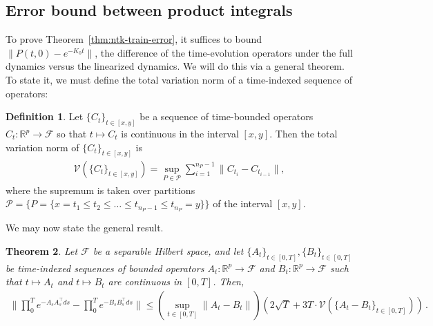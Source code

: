 \documentclass[11pt]{article} %
\newcommand{\R}{\mathbb{R}}
\newcommand{\<}{\langle}
\renewcommand{\>}{\rangle}
\def\cV{{\mathcal V}}
\def\cP{{\mathcal P}}
\def\cF{{\mathcal F}}
\def\cV{{\mathcal V}}
\def\cP{{\mathcal P}}
\def\cF{{\mathcal F}}
\def\cV{{\mathcal V}}
\theoremstyle{plain}
\newtheorem{theorem}{Theorem}[section]
\theoremstyle{definition}
\newtheorem{definition}[theorem]{Definition}
\theoremstyle{remark}
\begin{document}
\subsection{Error bound between product integrals}
To prove Theorem~\ref{thm:ntk-train-error}, it suffices to bound $\|P(t,0) - e^{-K_0t}\|$, the difference of the time-evolution operators under the full dynamics versus the linearized dynamics. We will do this via a general theorem. To state it, we must define the total variation norm of a time-indexed sequence of operators:
\begin{definition}
Let $\{C_t\}_{t \in [x,y]}$ be a sequence of time-bounded operators $C_t : \R^p \to \cF$ so that $t \mapsto C_t$ is continuous in the interval $[x,y]$. Then the total variation norm of $\{C_t\}_{t \in [x,y]}$ is
\begin{align*}
\cV(\{C_t\}_{t \in [x,y]}) = \sup_{P \in \cP} \sum_{i=1}^{n_{P}-1} \|C_{t_i} - C_{t_{i-1}}\|,
\end{align*}
where the supremum is taken over partitions $\cP = \{P = \{x = t_1 \leq t_2 \leq \dots \leq t_{n_P - 1} \leq t_{n_P} = y\}\}$ of the interval $[x,y]$.
\end{definition}

We may now state the general result.

\begin{theorem}\label{thm:operator-difference}
Let $\cF$ be a separable Hilbert space, and let $\{A_t\}_{t \in [0,T]}, \{B_t\}_{t \in [0,T]}$ be time-indexed sequences of bounded operators $A_t : \R^p \to \cF$ and $B_t : \R^p \to \cF$ such that $t \mapsto A_t$ and $t \mapsto B_t$ are continuous in $[0,T]$.
Then,
\begin{align*}
\|\prod_{0}^T e^{-A_s A_s^{\top} ds} - \prod_{0}^T e^{-B_s B_s^{\top} ds}\| \leq (\sup_{t \in [0,T]} \|A_t - B_t\|) (2\sqrt{T} + 3T \cdot \cV(\{A_t - B_t\}_{t \in [0,T]}))\,.\end{align*}
\end{theorem}
\end{document}
